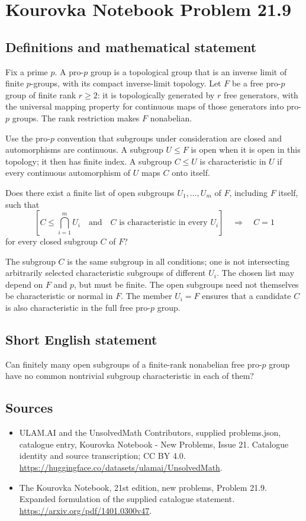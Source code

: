 \documentclass[11pt,a4paper]{article}
\begin{document}
\section*{Kourovka Notebook Problem 21.9}\label{statement}

\subsection{Definitions and mathematical statement}
Fix a prime $p$. A pro-$p$ group is a topological group that is an
inverse limit of finite $p$-groups, with its compact inverse-limit topology.
Let $F$ be a free pro-$p$ group of finite rank $r\ge2$: it is topologically
generated by $r$ free generators, with the universal mapping property
for continuous maps of those generators into pro-$p$ groups.
The rank restriction makes $F$ nonabelian.

Use the pro-$p$ convention that subgroups under consideration are closed
and automorphisms are continuous. A subgroup $U\le F$ is open when it
is open in this topology; it then has finite index. A subgroup $C\le U$
is characteristic in $U$ if every continuous automorphism of $U$ maps
$C$ onto itself.

Does there exist a finite list of open subgroups $U_1,\ldots,U_m$ of
$F$, including $F$ itself, such that
\[
 \left[C\le\bigcap_{i=1}^m U_i\quad\text{and}\quad
       C\text{ is characteristic in every }U_i\right]
 \quad\Longrightarrow\quad C=1
\]
for every closed subgroup $C$ of $F$?

The subgroup $C$ is the same subgroup in all conditions; one is not
intersecting arbitrarily selected characteristic subgroups of different
$U_i$. The chosen list may depend on $F$ and $p$, but must be finite.
The open subgroups need not themselves be characteristic or normal in
$F$. The member $U_i=F$ ensures that a candidate $C$ is also characteristic
in the full free pro-$p$ group.
\subsection{Short English statement}
Can finitely many open subgroups of a finite-rank nonabelian free pro-$p$ group have no common nontrivial subgroup characteristic in each of them?
\subsection{Sources}
\begin{itemize}
\item[S1] ULAM.AI and the UnsolvedMath Contributors, supplied problems.json, catalogue entry, Kourovka Notebook - New Problems, Issue 21. Catalogue identity and source transcription; CC BY 4.0.
\url{https://huggingface.co/datasets/ulamai/UnsolvedMath}.
\item[S2] The Kourovka Notebook, 21st edition, new problems, Problem 21.9. Expanded formulation of the supplied catalogue statement.
\url{https://arxiv.org/pdf/1401.0300v47}.
\end{itemize}
\end{document}
